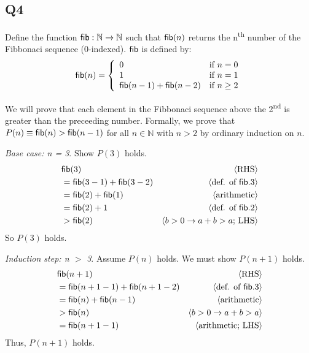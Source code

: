 \documentclass[12pt, fleqn]{article}
\newcommand{\pnote}[1]{{\langle \text{#1} \rangle}}
\newcommand{\mname}[1]{\mbox{\sf #1}}
\begin{document}
\subsection{Q4}
Define the function $\mname{fib} : \mathbb{N} \rightarrow \mathbb{N}$ such that $\mname{fib}(n)$ returns the
n\textsuperscript{th} number of the Fibbonaci sequence (0-indexed). $\mname{fib}$ is defined by:
\[\mname{fib}(n) = 
    \left\{\begin{array}{ll}
            0 & \textrm{if } n = 0 \\
            1 & \textrm{if } n = 1 \\
            \mname{fib}(n-1) + \mname{fib}(n-2) & \textrm{if } n \ge 2
            \end{array}
    \right.\]

We will prove that each element in the Fibbonaci sequence above the 2\textsuperscript{nd} is
greater than the preceeding number. Formally, we prove that $P(n) \equiv \mname{fib}(n) > \mname{fib}(n - 1)$
for all $n \in \mathbb{N}$ with $n > 2$ by ordinary induction on $n$.

\medskip

\emph{Base case: n = 3}. Show $P(3)$ holds.
\begin{align*}
    & \mname{fib}(3) & \pnote{RHS} \\
    &= \mname{fib}(3 - 1) + \mname{fib}(3 - 2) &  \pnote{def. of $\mname{fib}.3$} \\
    &= \mname{fib}(2) + \mname{fib}(1) & \pnote{arithmetic} \\
    &= \mname{fib}(2) + 1 & \pnote{def. of $\mname{fib}.2$} \\
    &> \mname{fib}(2) & \pnote{$b > 0 \rightarrow a + b > a$; LHS}
\end{align*}
So $P(3)$ holds.

\medskip

\emph{Induction step: n $>$ 3}. Assume $P(n)$ holds. We must show $P(n+1)$ holds.
\begin{align*}
    & \mname{fib}(n + 1) & \pnote{RHS} \\
    &= \mname{fib}(n + 1 - 1) + \mname{fib}(n + 1 - 2) &  \pnote{def. of $\mname{fib}.3$} \\
    &= \mname{fib}(n) + \mname{fib}(n - 1) & \pnote{arithmetic} \\
    &> \mname{fib}(n) & \pnote{$b > 0 \rightarrow a + b > a$} \\
    &= \mname{fib}(n + 1 - 1) & \pnote{arithmetic; LHS}
\end{align*}
Thus, $P(n+1)$ holds.
\end{document}
